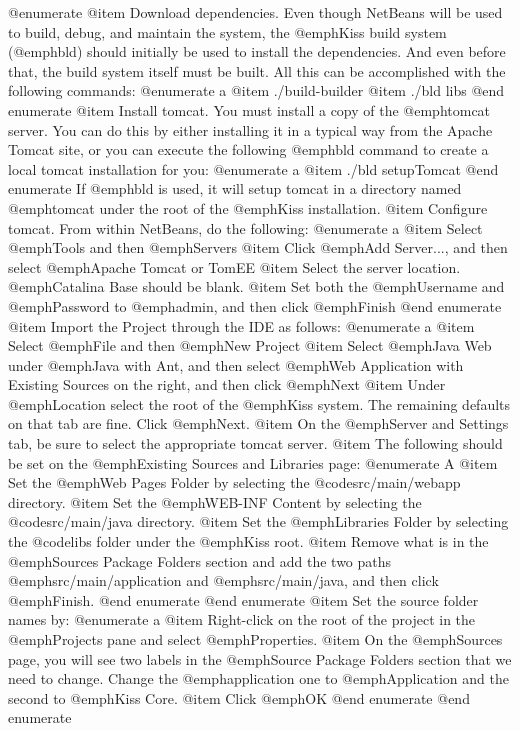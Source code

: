 @enumerate
@item
Download dependencies.  Even though NetBeans will be used to build,
debug, and maintain the system, the @emph{Kiss} build system
(@emph{bld}) should initially be used to install the dependencies.
And even before that, the build system itself must be built.  All this
can be accomplished with the following commands:
@enumerate a
@item
./build-builder
@item
./bld libs
@end enumerate
@item
Install tomcat.  You must install a copy of the @emph{tomcat} server.
You can do this by either installing it in a typical way from the
Apache Tomcat site, or you can execute the following @emph{bld}
command to create a local tomcat installation for you:
@enumerate a
@item
./bld setupTomcat
@end enumerate
If @emph{bld} is used, it will setup tomcat in a directory named @emph{tomcat} under
the root of the @emph{Kiss} installation.
@item
Configure tomcat.  From within NetBeans, do the following:
@enumerate a
@item
Select @emph{Tools} and then @emph{Servers}
@item
Click @emph{Add Server...}, and then select @emph{Apache Tomcat or TomEE}
@item
Select the server location.  @emph{Catalina Base} should be blank.
@item
Set both the @emph{Username} and @emph{Password} to @emph{admin}, and then click 
@emph{Finish}
@end enumerate
@item
Import the Project through the IDE as follows:
@enumerate a
@item
Select @emph{File} and then @emph{New Project}
@item
Select @emph{Java Web} under @emph{Java with Ant}, and then select
@emph{Web Application with Existing Sources} on the right, and then
click @emph{Next}
@item
Under @emph{Location} select the root of the @emph{Kiss} system.  The
remaining defaults on that tab are fine.  Click @emph{Next}.
@item
On the @emph{Server and Settings} tab, be sure to select the
appropriate tomcat server.
@item
The following should be set on the @emph{Existing Sources and Libraries} page:
@enumerate A
@item
Set the @emph{Web Pages Folder} by selecting the @code{src/main/webapp}
directory.
@item
Set the @emph{WEB-INF Content} by selecting the @code{src/main/java} directory.
@item
Set the @emph{Libraries Folder} by selecting the @code{libs} folder
under the @emph{Kiss} root.
@item
Remove what is in the @emph{Sources Package Folders} section and add the two paths
@emph{src/main/application} and @emph{src/main/java}, and then click @emph{Finish}.
@end enumerate
@end enumerate
@item
Set the source folder names by:
@enumerate a
@item
Right-click on the root of the project in the @emph{Projects} pane and
select @emph{Properties}.
@item
On the @emph{Sources} page, you will see two labels in the
@emph{Source Package Folders} section that we need to change.  Change
the @emph{application} one to @emph{Application} and the second to @emph{Kiss Core}.
@item
Click @emph{OK}
@end enumerate
@end enumerate


